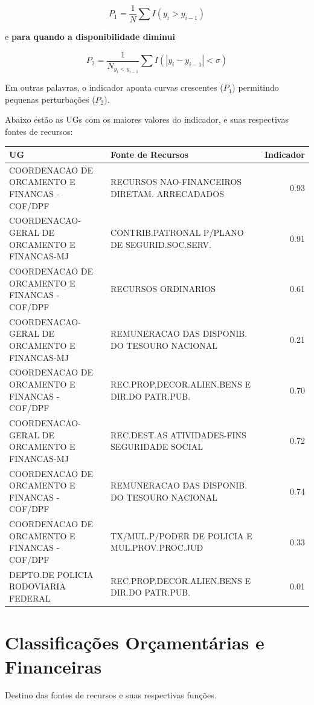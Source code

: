 \documentclass[]{book}
\begin{document}
\[
P_1 = \frac{1}{N}\sum I(y_i > y_{i - 1})
\]

e \textbf{para quando a disponibilidade diminui}

\[
P_2 = \frac{1}{N_{y_i < y_{i - 1}}}\sum I(|y_i -y_{i - 1}| < \sigma)
\]

Em outras palavras, o indicador aponta curvas crescentes (\(P_1\)) permitindo pequenas perturbações (\(P_2\)).

Abaixo estão as UGs com os maiores valores do indicador, e suas respectivas fontes de recursos:

\begin{tabular}{l|l|r}
\hline
UG & Fonte de Recursos & Indicador\\
\hline
COORDENACAO DE ORCAMENTO E FINANCAS - COF/DPF & RECURSOS NAO-FINANCEIROS DIRETAM. ARRECADADOS & 0.93\\
\hline
COORDENACAO-GERAL DE ORCAMENTO E FINANCAS-MJ & CONTRIB.PATRONAL P/PLANO DE SEGURID.SOC.SERV. & 0.91\\
\hline
COORDENACAO DE ORCAMENTO E FINANCAS - COF/DPF & RECURSOS ORDINARIOS & 0.61\\
\hline
COORDENACAO-GERAL DE ORCAMENTO E FINANCAS-MJ & REMUNERACAO DAS DISPONIB. DO TESOURO NACIONAL & 0.21\\
\hline
COORDENACAO DE ORCAMENTO E FINANCAS - COF/DPF & REC.PROP.DECOR.ALIEN.BENS E DIR.DO PATR.PUB. & 0.70\\
\hline
COORDENACAO-GERAL DE ORCAMENTO E FINANCAS-MJ & REC.DEST.AS ATIVIDADES-FINS SEGURIDADE SOCIAL & 0.72\\
\hline
COORDENACAO DE ORCAMENTO E FINANCAS - COF/DPF & REMUNERACAO DAS DISPONIB. DO TESOURO NACIONAL & 0.74\\
\hline
COORDENACAO DE ORCAMENTO E FINANCAS - COF/DPF & TX/MUL.P/PODER DE POLICIA E MUL.PROV.PROC.JUD & 0.33\\
\hline
DEPTO.DE POLICIA RODOVIARIA FEDERAL & REC.PROP.DECOR.ALIEN.BENS E DIR.DO PATR.PUB. & 0.01\\
\hline
\end{tabular}

\hypertarget{classificacoes-orcamentarias-e-financeiras}{%
\section{Classificações Orçamentárias e Financeiras}\label{classificacoes-orcamentarias-e-financeiras}}

Destino das fontes de recursos e suas respectivas funções.
\end{document}
